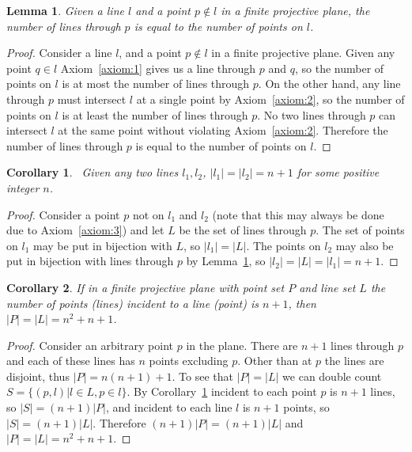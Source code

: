 \documentclass{article}
\newtheorem{lemma}{Lemma}
\newtheorem{corollary}{Corollary}
\begin{document}
\begin{lemma}\label{lemma:p-l-bijection}
  Given a line \(l\) and a point \(p \notin l\) in a finite projective plane, the number of lines through \(p\) is equal to the number of points on \(l\).
\end{lemma}
\begin{proof}
  Consider a line \(l\), and a point \(p \notin l\) in a finite projective plane. Given any point \(q \in l\) Axiom~\ref{axiom:1} gives us a line through \(p\) and \(q\), so the number of points on \(l\) is at most the number of lines through \(p\). On the other hand,
  any line through \(p\) must intersect \(l\) at a single point by Axiom~\ref{axiom:2}, so the number of points on \(l\) is at least the number of lines through \(p\). No two lines through \(p\) can intersect \(l\) at the same point without violating Axiom~\ref{axiom:2}. Therefore the number of lines through \(p\) is equal to the number of points on \(l\).
\end{proof}

\begin{corollary}~\label{cor:line-count}
  Given any two lines \(l_1, l_2\), \(|l_1| = |l_2| = n + 1\) for some positive integer \(n\).
\end{corollary}
\begin{proof}
  Consider a point \(p\) not on \(l_1\) and \(l_2\) (note that this may always be done due to Axiom~\ref{axiom:3}) and let \(L\) be the set of lines through \(p\). The set of points on \(l_{1}\) may be put in bijection with \(L\), so \(|l_{1}| = |L|\). The points on \(l_2\) may also be put in bijection with lines through \(p\) by Lemma~\ref{lemma:p-l-bijection},
  so \(|l_2| = |L| = |l_1| = n + 1\).
\end{proof}

\begin{corollary}
  If in a finite projective plane with point set \(P\) and line set \(L\) the number of points (lines) incident to a line (point) is \(n + 1\), then \(|P| = |L| = n^2 + n + 1\).
\end{corollary}
\begin{proof}\label{cor:p-count}
  Consider an arbitrary point \(p\) in the plane. There are \(n + 1\) lines through \(p\) and each of these lines has \(n\) points excluding \(p\). Other than at \(p\) the lines are disjoint, thus \(|P| = n(n + 1) + 1\).
  To see that \(|P| = |L|\) we can double count \(S = \{(p, l) | l \in L, p \in l\}\). By Corollary~\ref{cor:line-count} incident to each point \(p\) is \(n + 1\) lines, so \(|S| = (n + 1)|P|\), and incident to each line \(l\) is \(n + 1\) points, so \(|S| = (n + 1)|L|\). Therefore \((n + 1)|P| = (n + 1)|L|\) and \(|P| = |L| = n^2 + n + 1\).
\end{proof}
\end{document}

